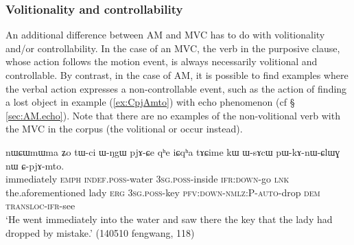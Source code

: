 \subsubsection{Volitionality and controllability}
An additional difference between AM and MVC has to do with volitionality and/or controllability. In the case of an MVC, the verb in the purposive clause, whose action follows the motion event, is always necessarily volitional and controllable. By contrast, in the case of AM, it is possible to find examples where the verbal action expresses a non-controllable event, such as the action of finding a lost object in example (\ref{ex:CpjAmto}) with echo phenomenon (cf § \ref{sec:AM.echo}). Note that there are no examples of the non-volitional verb  with the MVC in the corpus (the volitional  or  occur  instead). 

\begin{exe}
\ex  \label{ex:CpjAmto}
\gll  nɯɕɯmɯma ʑo tɯ-ci ɯ-ŋgɯ pjɤ-ɕe qʰe iɕqʰa tɤɕime kɯ ɯ-sɤcɯ pɯ-kɤ-nɯ-ɕlɯɣ nɯ ɕ-pjɤ-mto. \\
immediately \textsc{emph} \textsc{indef}.\textsc{poss}-water \textsc{3sg}.\textsc{poss}-inside \textsc{ifr}:\textsc{down}-go \textsc{lnk} the.aforementioned lady \textsc{erg} \textsc{3sg}.\textsc{poss}-key \textsc{pfv}:\textsc{down}-\textsc{nmlz}:P-\textsc{auto}-drop \textsc{dem} \textsc{transloc}-\textsc{ifr}-see \\
\glt `He went immediately into the water and saw there the key that the lady had dropped by mistake.' (140510 fengwang, 118)
\end{exe}

